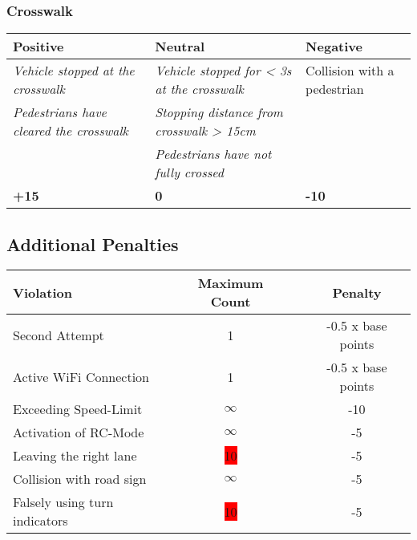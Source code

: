 {\subsubsection*{Crosswalk}
\begin{table}[H]
    \begin{tabularx}{\textwidth}{XXX}
        \toprule
        \textbf{Positive}                                               & \textbf{Neutral}                                                   & \textbf{Negative}           \\
        \midrule
        \textit{Vehicle stopped at the crosswalk}\footnotemark[2]       & \textit{Vehicle stopped for < 3s at the crosswalk}\footnotemark[2] & Collision with a pedestrian \\
        \textit{Pedestrians have cleared the crosswalk}\footnotemark[2] & \textit{Stopping distance from crosswalk > 15cm}\footnotemark[2]   &                             \\
                                                                        & \textit{Pedestrians have not fully crossed}\footnotemark[2]        &                             \\
        \topstrut
        \textbf{+15}                                                    & \textbf{0}                                                         & \textbf{-10}                \\
        \bottomrule
    \end{tabularx}
\end{table}


\subsection*{Additional Penalties}
\begin{table}[H]
    \begin{tabular}{@{}lccc@{}}
        \toprule
        \textbf{Violation}            & \textbf{Maximum Count} &  & \textbf{Penalty}   \\
        \midrule
        Second Attempt                & 1                      &  & -0.5 x base points \\
        Active WiFi Connection        & 1                      &  & -0.5 x base points \\
        Exceeding Speed-Limit         & $\infty$               &  & -10                \\
        Activation of RC-Mode         & $\infty$               &  & -5                 \\
        Leaving the right lane        & \colorbox{red}{10}     &  & -5                 \\
        Collision with road sign      & $\infty$               &  & -5                 \\
        Falsely using turn indicators & \colorbox{red}{10}     &  & -5                 \\
        \bottomrule
    \end{tabular}
\end{table}
\clearpage
}
